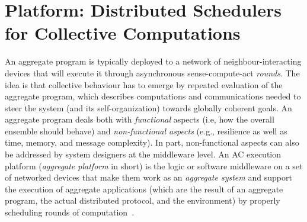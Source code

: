 \newcommand{\export}{export}
\newcommand{\round}{round}

\newcommand{\decision}[1]{{\color{red} #1}}
\newcommand{\mtext}[1]{\text{\texttt{#1}}}
\newenvironment{iequation}{\(}{\). }
\def\tablename{Table}
\sloppypar

\newcommand{\scafiinline}[1]{\lstinline[language=scafi]$#1$}


\chapter[Platform: Distributed Schedulers for Collective Computations]{
    Platform: Distributed Schedulers for Collective Computations
}\label{chap:rl:schedulers}%
\minitoc%
%

An aggregate program is typically deployed
 to a network of neighbour-interacting devices
 that will execute it 
 through asynchronous sense-compute-act \emph{rounds}.
%
%
The idea is that collective behaviour 
 has to emerge by repeated evaluation of the aggregate program,
 which describes computations and communications
 needed to steer the system (and its self-organization)
 towards globally coherent goals.
%
An aggregate program deals both with \emph{functional} aspects (i.e, how the overall ensemble should behave) 
 and \emph{non-functional aspects} (e.g., resilience as well as time, memory, and message complexity).
%
In part, non-functional aspects 
 can also be addressed by system designers
 at the middleware level.
%
An \ac{AC} execution platform (\emph{aggregate platform} in short) is the logic or software middleware 
 on a set of networked devices 
 that make them work as an \emph{aggregate system}
 and support the execution of aggregate applications (which are the result of an aggregate program, the actual distributed protocol, and the environment) by properly scheduling rounds of computation~\cite{DBLP:journals/fi/CasadeiPPVW20}. 

